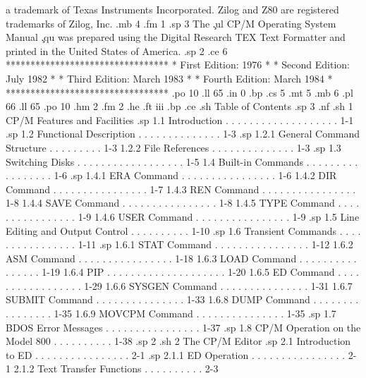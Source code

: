 a trademark of Texas Instruments Incorporated.  Zilog and Z80 are
registered trademarks of Zilog, Inc.
.mb 4
.fm 1
.sp 3
The \c
.ul
CP/M Operating System Manual \c
.qu
was prepared using the Digital Research TEX Text Formatter and printed
in the United States of America.
.sp 2
.ce 6
*********************************
*   First Edition:  1976        *
*  Second Edition:  July 1982   *
*   Third Edition:  March 1983  *
*  Fourth Edition:  March 1984  *
*********************************
.po 10
.ll 65
.in 0
.bp
.cs 5
.mt 5
.mb 6
.pl 66
.ll 65
.po 10
.hm 2
.fm 2
.he
.ft                                iii
.bp
.ce
.sh
Table of Contents
.sp 3
.nf
.sh
1  CP/M Features and Facilities
.sp
   1.1  Introduction  . . . . . . . . . . . . . . . . . . .   1-1
.sp
   1.2  Functional Description  . . . . . . . . . . . . . .   1-3
.sp
        1.2.1  General Command Structure  . . . . . . . . .   1-3
        1.2.2  File References  . . . . . . . . . . . . . .   1-3
.sp
   1.3  Switching Disks . . . . . . . . . . . . . . . . . .   1-5
   1.4  Built-in Commands . . . . . . . . . . . . . . . . .   1-6
.sp
        1.4.1  ERA Command  . . . . . . . . . . . . . . . .   1-6
        1.4.2  DIR Command  . . . . . . . . . . . . . . . .   1-7
        1.4.3  REN Command  . . . . . . . . . . . . . . . .   1-8
        1.4.4  SAVE Command . . . . . . . . . . . . . . . .   1-8
        1.4.5  TYPE Command . . . . . . . . . . . . . . . .   1-9
        1.4.6  USER Command . . . . . . . . . . . . . . . .   1-9
.sp
   1.5  Line Editing and Output Control . . . . . . . . . .  1-10
.sp
   1.6  Transient Commands  . . . . . . . . . . . . . . . .  1-11
.sp
        1.6.1  STAT Command . . . . . . . . . . . . . . . .  1-12
        1.6.2  ASM Command  . . . . . . . . . . . . . . . .  1-18
        1.6.3  LOAD Command . . . . . . . . . . . . . . . .  1-19
        1.6.4  PIP  . . . . . . . . . . . . . . . . . . . .  1-20
        1.6.5  ED Command . . . . . . . . . . . . . . . . .  1-29
        1.6.6  SYSGEN Command . . . . . . . . . . . . . . .  1-31
        1.6.7  SUBMIT Command . . . . . . . . . . . . . . .  1-33
        1.6.8  DUMP Command . . . . . . . . . . . . . . . .  1-35
        1.6.9  MOVCPM Command . . . . . . . . . . . . . . .  1-35
.sp
   1.7  BDOS Error Messages . . . . . . . . . . . . . . . .  1-37
.sp
   1.8  CP/M Operation on the Model 800 . . . . . . . . . .  1-38
.sp 2
.sh
2  The CP/M Editor
.sp
   2.1  Introduction to ED  . . . . . . . . . . . . . . . .   2-1
.sp
        2.1.1  ED Operation . . . . . . . . . . . . . . . .   2-1
        2.1.2  Text Transfer Functions  . . . . . . . . . .   2-3
